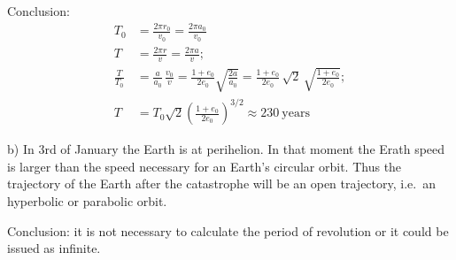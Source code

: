 \begin{description}
  Conclusion:
  \begin{align*}
    T_0 &= \frac{2\pi r_0}{v_0} = \frac{2\pi a_0}{v_0} \\
    T &= \frac{2\pi r}{v} = \frac{2\pi a}{v}; \\
    \frac{T}{T_0} &= \frac{a}{a_0}\,\frac{v_0}{v}
      = \frac{1 + e_0}{2e_0}\sqrt{\frac{2a}{a_0}}
      = \frac{1 + e_0}{2e_0}\,\sqrt{2}\,\sqrt{\frac{1 + e_0}{2e_0}}; \\
    T &= T_0\sqrt{2}\left(\frac{1 + e_0}{2e_0}\right)^{3/2}
      \approx 230\ \text{years}
  \end{align*}

  b) In 3rd of January the Earth is at perihelion. In that moment the Erath %
  speed is larger than the speed necessary for an Earth's circular orbit.
  Thus the trajectory of the Earth after the catastrophe will be an open
  trajectory, i.e.\ an hyperbolic or parabolic orbit.

  Conclusion: it is not necessary to calculate the period of revolution or it
  could be issued as infinite.
\end{description}
